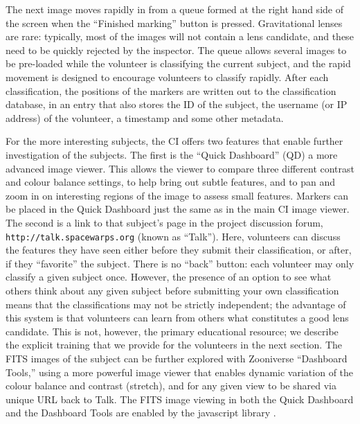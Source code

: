 \documentclass[useAMS,usenatbib,a4paper]{mn2e}
\begin{document}
The next image moves rapidly in from a queue formed at the right hand side of
the screen when the ``Finished marking'' button is pressed. Gravitational lenses
are rare: typically, most of the images will not contain a lens candidate, and
these need to be quickly rejected by the inspector. The queue allows several
images to be pre-loaded while the volunteer is classifying the current subject,
and the rapid movement is designed to encourage volunteers to classify rapidly.
After each classification, the positions of the markers are written out to the
classification database, in an entry that also stores the ID of the subject, the
username (or IP address) of the volunteer, a timestamp and some other metadata.

For the more interesting subjects, the CI offers two features that  enable
further investigation of the subjects. The first is the ``Quick Dashboard''
(QD) a more advanced image viewer. This allows the viewer to compare three
different contrast and colour balance settings, to help bring out subtle
features, and to pan and zoom in on interesting regions of the image to assess
small features. Markers can be placed in the Quick Dashboard just the same as
in the main CI image viewer. The second is a link to that subject's page in
the project discussion forum, \texttt{http://talk.spacewarps.org} (known as
``Talk''). Here, volunteers can discuss the features they have seen either
before they submit their classification, or after, if they ``favorite'' the
subject. There is no ``back'' button: each volunteer may only classify a given
subject once. However, the presence of an option to see what others think
about any given subject before submitting your own classification means that
the classifications may not be strictly independent; the advantage of this
system is that volunteers can learn from others what constitutes a good lens
candidate. This is not, however, the primary educational resource; we describe
the explicit training that we provide for the volunteers in the next section.
The FITS images of the subject can be further explored with Zooniverse
``Dashboard Tools,'' using a more powerful image viewer that enables dynamic
variation of the colour balance and contrast (stretch), and for any given view
to be shared via unique URL back to Talk. The FITS image viewing in both the
Quick Dashboard and the Dashboard Tools are enabled by the javascript library
\fitsjs \citep{fitsjs}.


\end{document}
